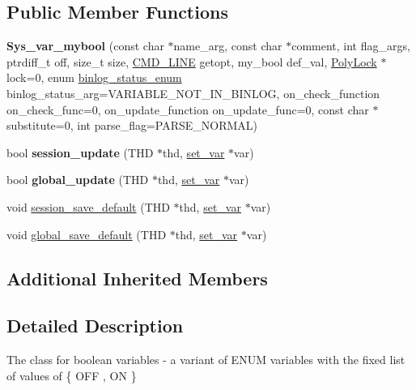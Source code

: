 \subsection*{Public Member Functions}
\begin{DoxyCompactItemize}
\item 
\mbox{\label{classSys__var__mybool_a8d001c59668928d91dae12d8442580ab}} 
{\bfseries Sys\+\_\+var\+\_\+mybool} (const char $\ast$name\+\_\+arg, const char $\ast$comment, int flag\+\_\+args, ptrdiff\+\_\+t off, size\+\_\+t size, \mbox{\hyperlink{structCMD__LINE}{C\+M\+D\+\_\+\+L\+I\+NE}} getopt, my\+\_\+bool def\+\_\+val, \mbox{\hyperlink{classPolyLock}{Poly\+Lock}} $\ast$lock=0, enum \mbox{\hyperlink{classsys__var_a664520ec82191888717c86085bfa83ce}{binlog\+\_\+status\+\_\+enum}} binlog\+\_\+status\+\_\+arg=V\+A\+R\+I\+A\+B\+L\+E\+\_\+\+N\+O\+T\+\_\+\+I\+N\+\_\+\+B\+I\+N\+L\+OG, on\+\_\+check\+\_\+function on\+\_\+check\+\_\+func=0, on\+\_\+update\+\_\+function on\+\_\+update\+\_\+func=0, const char $\ast$substitute=0, int parse\+\_\+flag=P\+A\+R\+S\+E\+\_\+\+N\+O\+R\+M\+AL)
\item 
\mbox{\label{classSys__var__mybool_a0c3f80b9953fcfa3b7c2cef203a1ea30}} 
bool {\bfseries session\+\_\+update} (T\+HD $\ast$thd, \mbox{\hyperlink{classset__var}{set\+\_\+var}} $\ast$var)
\item 
\mbox{\label{classSys__var__mybool_a75b322d7e1367054b8bc84598368b9c6}} 
bool {\bfseries global\+\_\+update} (T\+HD $\ast$thd, \mbox{\hyperlink{classset__var}{set\+\_\+var}} $\ast$var)
\item 
void \mbox{\hyperlink{classSys__var__mybool_a7c0f82c4951aa5a3b41921a62197473d}{session\+\_\+save\+\_\+default}} (T\+HD $\ast$thd, \mbox{\hyperlink{classset__var}{set\+\_\+var}} $\ast$var)
\item 
void \mbox{\hyperlink{classSys__var__mybool_aecba009ba09790acfb4201c2d1bb1f84}{global\+\_\+save\+\_\+default}} (T\+HD $\ast$thd, \mbox{\hyperlink{classset__var}{set\+\_\+var}} $\ast$var)
\end{DoxyCompactItemize}
\subsection*{Additional Inherited Members}


\subsection{Detailed Description}
The class for boolean variables -\/ a variant of E\+N\+UM variables with the fixed list of values of \{ O\+FF , ON \}

